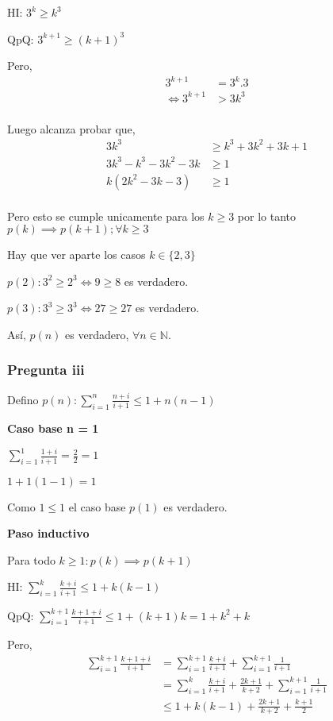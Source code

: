 HI: $ 3^k \geq k^3$

QpQ: $ 3^{k+1} \geq (k+1)^3$

Pero,
\begin{align*}
    3^{k+1} &= 3^k . 3 \\
    \iff 3^{k+1} &> 3k^3 \\
\end{align*}

Luego alcanza probar que,
\begin{align*}
    3k^3 &\geq k^3 + 3k^2 + 3k + 1 \\
    3k^3 - k^3 - 3k^2 - 3k &\geq 1 \\
    k(2k^2 - 3k -3) &\geq 1 \\
\end{align*}

Pero esto se cumple unicamente para los $k \geq 3$ por lo tanto $p(k) \implies p(k+1); \forall k \geq 3$

Hay que ver aparte los casos $k \in \{ 2,3 \}$

$p(2): 3^2 \geq 2^3 \iff 9 \geq 8$ es verdadero.

$p(3): 3^3 \geq 3^3 \iff 27 \geq 27$ es verdadero.

Así, $p(n)$ es verdadero, $\forall n \in \mathbb{N}$.

\subsubsection{Pregunta iii}

Defino $ p(n): \sum_{i=1}^{n}\frac{n+i}{i+1} \leq 1+n(n-1)$

\textbf{Caso base n = 1}

$ \sum_{i=1}^{1}\frac{1+i}{i+1} = \frac{2}{2} = 1 $

$ 1+1(1-1) = 1 $

Como $ 1 \leq 1 $ el caso base $p(1)$ es verdadero.

\textbf{Paso inductivo}

Para todo $k \geq 1: p(k) \implies p(k+1)$

HI: $\sum_{i=1}^{k}\frac{k+i}{i+1} \leq 1+k(k-1)$

QpQ: $ \sum_{i=1}^{k+1}\frac{k+1+i}{i+1} \leq 1+(k+1)k = 1+k^2 + k$

Pero,
\begin{align*}
    \sum_{i=1}^{k+1}\frac{k+1+i}{i+1} &= \sum_{i=1}^{k+1}\frac{k+i}{i+1} + \sum_{i=1}^{k+1}\frac{1}{i+1} \\
    &= \sum_{i=1}^{k}\frac{k+i}{i+1} + \frac{2k+1}{k+2} + \sum_{i=1}^{k+1}\frac{1}{i+1} \\
    &\leq 1+k(k-1) + \frac{2k+1}{k+2} + \frac{k+1}{2} \\
\end{align*}

